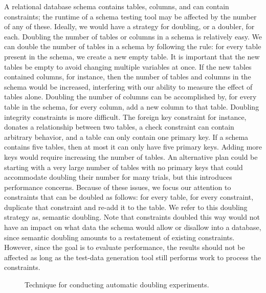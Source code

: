   A relational database schema contains tables, columns, and can contain
  constraints; the runtime of a schema testing tool may be affected by the
  number of any of these. Ideally, we would have a strategy for doubling, 
  or a doubler, for each. Doubling the number of tables or columns in a
  schema is relatively easy.  We can double the number of tables in a schema
  by following the rule: for every table present in the schema, we create
  a new empty table. It is important that the new tables be empty to avoid
  changing multiple variables at once.  If the new tables contained
  columns, for instance, then the number of tables and columns in the schema
  would be increased, interfering with our ability to measure the effect of
  tables alone.  Doubling the number of columns can be accomplished by, for
  every table in the schema, for every column, add a new column to that table. 
  Doubling integrity constraints is more difficult.  The foreign key
  constraint for instance, donates a relationship between two tables, a check
  constraint can contain arbitrary behavior, and a table can only contain one
  primary key.  If a schema contains five tables, then at most it can only
  have five primary keys.  Adding more keys would require increasing the
  number of tables.  An alternative plan could be starting with a very large
  number of tables with no primary keys that could accommodate doubling their
  number for many trials, but this introduces performance concerns.  Because
  of these issues, we focus our attention to constraints that can be doubled
  as follows: for every table, for every constraint, duplicate that
  constraint and re-add it to the table.  We refer to this doubling strategy
  as, semantic doubling.  Note that constraints doubled this way would not have
  an impact on what data the schema would allow or disallow into a database,
  since semantic doubling amounts to a restatement of existing constraints.
  However, since the goal is to evaluate performance, the results should not be
  affected as long as the test-data generation tool still performs work to
  process the constraints. 



  \begin{figure*}
    
    \caption{Technique for conducting automatic doubling experiments.}
    \label{fig:doublingexp}
  \end{figure*}

